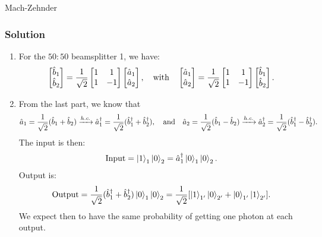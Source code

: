 \begin{example}{Mach-Zehnder}
    \subsubsection{Solution}
\begin{enumerate}[itemsep=0pt,topsep=0pt,parsep=0pt,label=(\alph*)]
  \item For the $50:50$ beamsplitter 1, we have:
  \begin{align*}
    \begin{bmatrix}
      \hat{b}_1\\\hat{b}_2
    \end{bmatrix}=\frac{1}{\sqrt{2}}\begin{bmatrix}
      1&1\\1&-1
    \end{bmatrix}\begin{bmatrix}
      \hat{a}_1\\\hat{a}_2
    \end{bmatrix},\quad\text{with}\quad\begin{bmatrix}
      \hat{a}_1\\\hat{a}_2
    \end{bmatrix}=\frac{1}{\sqrt{2}}\begin{bmatrix}
      1&1\\1&-1
    \end{bmatrix}\begin{bmatrix}
      \hat{b}_1\\\hat{b}_2
    \end{bmatrix}.
  \end{align*}
  \item From the last part, we know that 
  \begin{align*}
    \hat{a}_1=\frac{1}{\sqrt{2}}(\hat{b}_1+\hat{b}_2)\xrightarrow{h.c.}\hat{a}_1^\dagger=\frac{1}{\sqrt{2}}(\hat{b}_1^\dagger+\hat{b}_2^\dagger),\quad\text{and}\quad
    \hat{a}_2=\frac{1}{\sqrt{2}}(\hat{b}_1-\hat{b}_2)\xrightarrow{h.c.}\hat{a}_2^\dagger=\frac{1}{\sqrt{2}}(\hat{b}_1^\dagger-\hat{b}_2^\dagger).
  \end{align*}
  The input is then:
  \begin{align*}
    \text{Input}=\left|1\right\rangle_1\left|0\right\rangle_2=\hat{a}^\dagger_1\left|0\right\rangle_1\left|0\right\rangle_2.
  \end{align*}
  Output is:
  \begin{align*}
    \text{Output}=\frac{1}{\sqrt{2}}(\hat{b}_1^\dagger+\hat{b}_2^\dagger)\left|0\right\rangle_1\left|0\right\rangle_2=\frac{1}{\sqrt{2}}[\left|1\right\rangle_{1'}\left|0\right\rangle_{2'}+\left|0\right\rangle_{1'}\left|1\right\rangle_{2'}].
  \end{align*}
  We expect then to have the same probability of getting one photon at each output. 


\end{enumerate}
\end{example}
